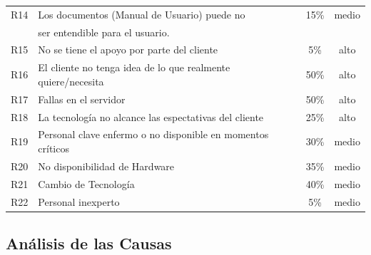 \documentclass[11pt,letterpaper]{report}
\begin{document}
\begin{tabular}{|c|l|c|c|}
	R14 & Los documentos (Manual de Usuario) puede no  & 15\% & medio \\ 
	& ser entendible para el usuario. && \\ \hline
	R15 & No se tiene el apoyo por parte del cliente & 5\% & alto \\ \hline
	R16 & El cliente no tenga idea de lo que realmente quiere/necesita & 50\% & alto \\ \hline
	R17 & Fallas en el servidor & 50\% & alto \\ \hline
	R18 & La tecnología no alcance las espectativas del cliente & 25\% & alto \\ \hline
	R19 & Personal clave enfermo o no disponible en momentos críticos & 30\% & medio \\ \hline
	R20 & No disponibilidad de Hardware & 35\% & medio \\ \hline
	R21 & Cambio de Tecnología & 40\% & medio \\ \hline
	R22 & Personal inexperto & 5\% & medio \\ \hline
\end{tabular}

\subsection{Análisis de las Causas}
\end{document}
